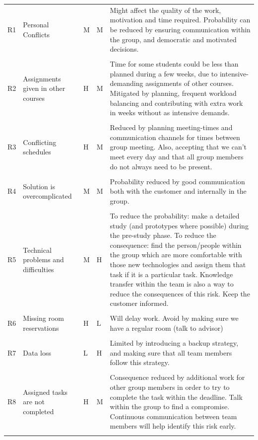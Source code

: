 \documentclass[11pt,a4paper,titlepage,oneside]{report}
\begin{document}
\begin{longtable}{p{0.7cm} p{2.5cm} p{0.7cm} p{0.7cm} p{6.5cm} }
  \hline
R1 & Personal Conflicts & \gls{M} & \gls{M} & Might affect the quality of the work, motivation and time required. Probability can be reduced by ensuring communication within the group, and democratic and motivated decisions. \\ \\ \hline
R2 & Assignments given in other courses & \gls{H} & \gls{M} & Time for some students could be less than planned during a few weeks, due to intensive-demanding assignments of other courses. Mitigated by planning, frequent workload balancing and contributing with extra work in weeks without as intensive demands. \\ \\ \hline
R3 & Conflicting schedules & \gls{H} & \gls{M} & Reduced by planning meeting-times and communication channels for times between group meeting. Also, accepting that we can't meet every day and that all group members do not always need to be present. \\ \\ \hline
R4 & Solution is overcomplicated & \gls{M} & \gls{M} & Probability reduced by good communication both with the customer and internally in the group. \\ \\ \hline
R5 & Technical problems and difficulties & \gls{M} & \gls{H} & To reduce the probability: make a detailed study (and prototypes where possible) during the pre-study phase. To reduce the consequence: find the person/people within the group which are more comfortable with those new technologies and assign them that task if it is a particular task. Knowledge transfer within the team is also a way to reduce the consequences of this risk. Keep the customer informed. \\ \\ \hline
R6 & Missing room reservations & \gls{H} & \gls{L} & Will delay work. Avoid by making sure we have a regular room (talk to advisor) \\ \\ \hline
R7 & Data loss & \gls{L} & \gls{H} & Limited by introducing a backup strategy, and making sure that all team members follow this strategy. \\ \\ \hline
R8 & Assigned tasks are not completed & \gls{H} & \gls{M} & Consequence reduced by additional work for other group members in order to try to complete the task within the deadline. Talk within the group to find a compromise. Continuous communication between team members will help identify this risk early.  \\ \\ \hline

\end{longtable}
\end{document}
